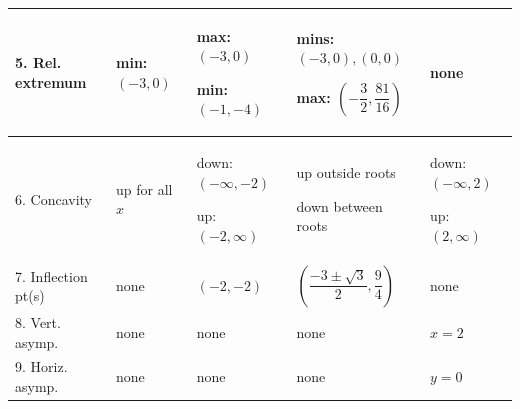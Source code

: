\begin{tabularx}{\linewidth}{|p{2.5cm}|X|X|X|X|}
5. Rel. extremum
&
min: $(-3,0)$
&
max: $(-3,0)$\par
min: $(-1,-4)$
&
mins: $(-3,0),(0,0)$\par
max: $\left(-\dfrac32,\dfrac{81}{16}\right)$
&
none
\\
\hline

6. Concavity
&
up for all $x$
&
down: $(-\infty,-2)$\par
up: $(-2,\infty)$
&
up outside roots\par
down between roots
&
down: $(-\infty,2)$\par
up: $(2,\infty)$
\\
\hline

7. Inflection pt(s)
&
none
&
$(-2,-2)$
&
$\left(\dfrac{-3\pm\sqrt3}{2},\dfrac94\right)$
&
none
\\
\hline

8. Vert. asymp.
&
none
&
none
&
none
&
$x=2$
\\
\hline

9. Horiz. asymp.
&
none
&
none
&
none
&
$y=0$
\\
\hline

\end{tabularx}